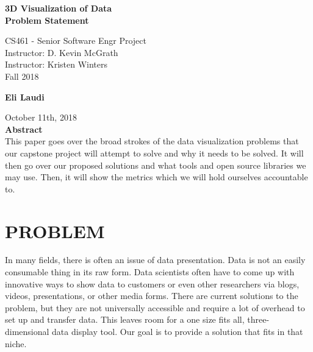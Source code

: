 \documentclass[journal,10pt,onecolumn,compsoc]{IEEEtran}
\begin{document}
\begin{titlepage}
\begin{center}
  
  \textbf{}

  \vspace{6cm}
  \Huge{}
  \textbf{3D Visualization of Data \\ Problem Statement}
  \vspace{3cm}

 
  \LARGE
  CS461 - Senior Software Engr Project\\
  \vspace{0.25cm}
  Instructor: D. Kevin McGrath \\
  Instructor: Kristen Winters \\
  \vspace{0.25cm}
  Fall 2018 \\
  \vspace{1.5cm}
  
  \textbf{Eli Laudi}
  \date{October 9th, 2018}
  \vfill
  October 11th, 2018\\
  \vspace{1cm}
  \vspace*{\fill}
  \textbf{Abstract} \\
  \normalsize
  This paper goes over the broad strokes of the data visualization problems that our capstone project will attempt to solve and why it needs to be solved. It will then go over our proposed solutions and what tools and open source libraries we may use. Then, it will show the metrics which we will hold ourselves accountable to.
  \end{center}
  \end{titlepage}
  
\section{PROBLEM}
In many fields, there is often an issue of data presentation. Data is not an easily consumable thing in its raw form. Data scientists often have to come up with innovative ways to show data to customers or even other researchers via blogs, videos, presentations, or other media forms. There are current solutions to the problem, but they are not universally accessible and require a lot of overhead to set up and transfer data. This leaves room for a one size fits all, three-dimensional data display tool. Our goal is to provide a solution that fits in that niche.
\end{document}
